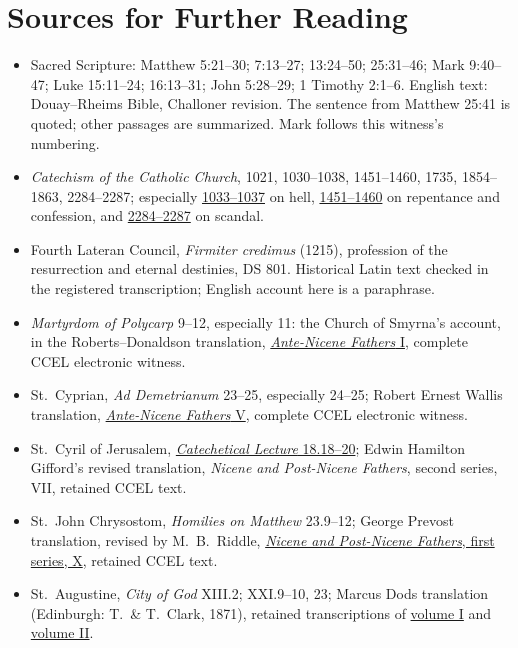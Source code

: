 \section{Sources for Further Reading}
\begingroup\small
\ifdefined\TriptychPrintEdition
{}
\else
\fi
\begin{itemize}[leftmargin=1.25em,itemsep=0.2em]
\item Sacred Scripture: Matthew 5:21--30; 7:13--27; 13:24--50; 25:31--46; Mark 9:40--47; Luke 15:11--24; 16:13--31; John 5:28--29; 1 Timothy 2:1--6. English text: Douay--Rheims Bible, Challoner revision. The sentence from Matthew 25:41 is quoted; other passages are summarized. Mark follows this witness's numbering.
\item \emph{Catechism of the Catholic Church}, 1021, 1030--1038, 1451--1460, 1735, 1854--1863, 2284--2287; especially \href{https://www.vatican.va/archive/ENG0015/__P2O.HTM}{1033--1037} on hell, \href{https://www.vatican.va/archive/ENG0015/__P4D.HTM}{1451--1460} on repentance and confession, and \href{https://www.vatican.va/archive/ENG0015/__P80.HTM}{2284--2287} on scandal.
\item Fourth Lateran Council, \emph{Firmiter credimus} (1215), profession of the resurrection and eternal destinies, DS 801. Historical Latin text checked in the registered transcription; English account here is a paraphrase.
\item \emph{Martyrdom of Polycarp} 9--12, especially 11: the Church of Smyrna's account, in the Roberts--Donaldson translation, \href{https://ccel.org/ccel/schaff/anf01.iv.iv.xi.html}{\emph{Ante-Nicene Fathers} I}, complete CCEL electronic witness.
\item St.~Cyprian, \emph{Ad Demetrianum} 23--25, especially 24--25; Robert Ernest Wallis translation, \href{https://ccel.org/ccel/cyprian/epistles/anf05.iv.v.v.html}{\emph{Ante-Nicene Fathers} V}, complete CCEL electronic witness.
\item St.~Cyril of Jerusalem, \href{https://ccel.org/ccel/schaff/npnf207.ii.xxii.html}{\emph{Catechetical Lecture} 18.18--20}; Edwin Hamilton Gifford's revised translation, \emph{Nicene and Post-Nicene Fathers}, second series, VII, retained CCEL text.
\item St.~John Chrysostom, \emph{Homilies on Matthew} 23.9--12; George Prevost translation, revised by M.~B.~Riddle, \href{https://ccel.org/ccel/s/schaff/npnf110/cache/npnf110.txt}{\emph{Nicene and Post-Nicene Fathers}, first series, X}, retained CCEL text.
\item St.~Augustine, \emph{City of God} XIII.2; XXI.9--10, 23; Marcus Dods translation (Edinburgh: T.~\& T.~Clark, 1871), retained transcriptions of \href{https://www.gutenberg.org/ebooks/45304}{volume I} and \href{https://www.gutenberg.org/ebooks/45305}{volume II}.

\end{itemize}
